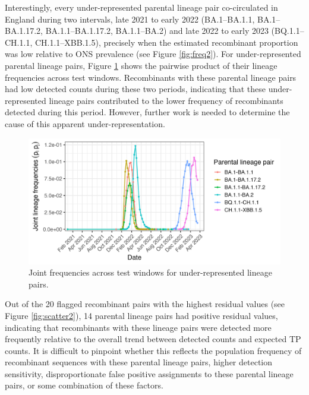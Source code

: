 \documentclass[11pt,oneside,letterpaper]{article}
\begin{document}
Interestingly, every under-represented parental lineage pair co-circulated in England during two intervals, late 2021 to early 2022 (BA.1--BA.1.1, BA.1--BA.1.17.2, BA.1.1--BA.1.17.2, BA.1.1--BA.2) and late 2022 to early 2023 (BQ.1.1--CH.1.1, CH.1.1--XBB.1.5), precisely when the estimated recombinant proportion was low relative to ONS prevalence (see Figure \ref{fig:freq2}). For under-represented parental lineage pairs, Figure \ref{fig:freq_pair} shows the pairwise product of their lineage frequencies across test windows. Recombinants with these parental lineage pairs had low detected counts during these two periods, indicating that these under-represented lineage pairs contributed to the lower frequency of recombinants detected during this period. However, further work is needed to determine the cause of this apparent under-representation. 


\begin{figure}[H]
\centering
\includegraphics[width=\textwidth]{figures/hmm/pipj_selected_pairs.png}
\caption[traj]{Joint frequencies across test windows for under-represented lineage pairs.}
\label{fig:freq_pair}
\end{figure}

Out of the 20 flagged recombinant pairs with the highest residual values (see Figure \ref{fig:scatter2}), 14 parental lineage pairs had positive residual values, indicating that recombinants with these lineage pairs were detected more frequently relative to the overall trend between detected counts and expected TP counts. It is difficult to pinpoint whether this reflects the population frequency of recombinant sequences with these parental lineage pairs, higher detection sensitivity, disproportionate false positive assignments to these parental lineage pairs, or some combination of these factors.
\end{document}
